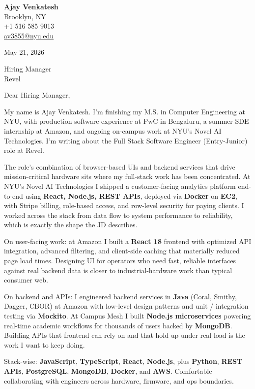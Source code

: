 \documentclass[letterpaper,11pt]{article}
\begin{document}
\begin{flushleft}
\textbf{\large Ajay Venkatesh} \\
Brooklyn, NY \\
+1 516 585 9013 \\
\href{mailto:av3855@nyu.edu}{av3855@nyu.edu}
\end{flushleft}
\vspace{10pt}
May 21, 2026
\vspace{6pt}

Hiring Manager \\
Revel

\vspace{10pt}

Dear Hiring Manager,

My name is Ajay Venkatesh. I'm finishing my M.S. in Computer Engineering at NYU, with production software experience at PwC in Bengaluru, a summer SDE internship at Amazon, and ongoing on-campus work at NYU's Novel AI Technologies. I'm writing about the Full Stack Software Engineer (Entry-Junior) role at Revel.

The role's combination of browser-based UIs and backend services that drive mission-critical hardware sits where my full-stack work has been concentrated. At NYU's Novel AI Technologies I shipped a customer-facing analytics platform end-to-end using \textbf{React, Node.js, REST APIs}, deployed via \textbf{Docker} on \textbf{EC2}, with Stripe billing, role-based access, and row-level security for paying clients. I worked across the stack from data flow to system performance to reliability, which is exactly the shape the JD describes.

On user-facing work: at Amazon I built a \textbf{React 18} frontend with optimized API integration, advanced filtering, and client-side caching that materially reduced page load times. Designing UI for operators who need fast, reliable interfaces against real backend data is closer to industrial-hardware work than typical consumer web.

On backend and APIs: I engineered backend services in \textbf{Java} (Coral, Smithy, Dagger, CBOR) at Amazon with low-level design patterns and unit / integration testing via \textbf{Mockito}. At Campus Mesh I built \textbf{Node.js microservices} powering real-time academic workflows for thousands of users backed by \textbf{MongoDB}. Building APIs that frontend can rely on and that hold up under real load is the work I want to keep doing.

Stack-wise: \textbf{JavaScript}, \textbf{TypeScript}, \textbf{React}, \textbf{Node.js}, plus \textbf{Python}, \textbf{REST APIs}, \textbf{PostgreSQL}, \textbf{MongoDB}, \textbf{Docker}, and \textbf{AWS}. Comfortable collaborating with engineers across hardware, firmware, and ops boundaries.
\end{document}
